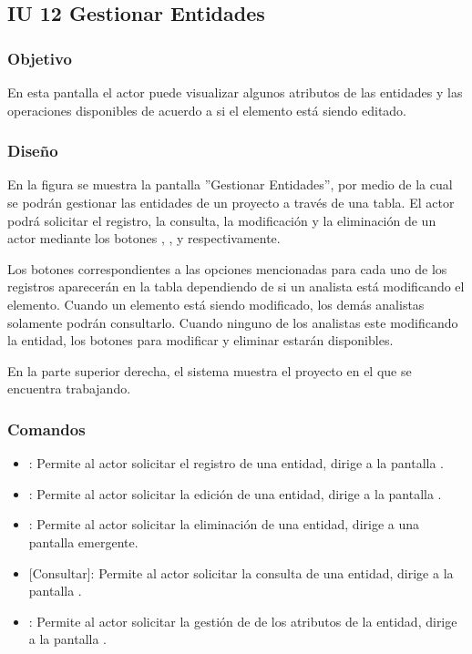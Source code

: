 \subsection{IU 12 Gestionar Entidades}

\subsubsection{Objetivo}
	En esta pantalla el actor puede visualizar algunos atributos de las entidades y las operaciones disponibles de acuerdo a si el elemento está siendo editado.
\subsubsection{Diseño}
	En la figura  se muestra la pantalla ''Gestionar Entidades'', por medio de la cual se podrán gestionar las entidades de un proyecto a través de una tabla. El actor podrá solicitar el registro, la consulta, la modificación y la eliminación de un actor mediante los botones , , \editar y \eliminar respectivamente.
	
	Los botones correspondientes a las opciones mencionadas para cada uno de los registros aparecerán en la tabla dependiendo de si un analista está modificando el elemento. Cuando un elemento está siendo modificado, los demás analistas solamente podrán consultarlo. Cuando ninguno de los analistas este modificando la entidad, los botones para modificar y eliminar estarán disponibles.
	
	En la parte superior derecha, el sistema muestra el proyecto en el que se encuentra trabajando.

\subsubsection{Comandos}
\begin{itemize}
	\item {}: Permite al actor solicitar el registro de una entidad, dirige a la pantalla .
	\item \editar [Modificar]: Permite al actor solicitar la edición de una entidad, dirige a la pantalla .
	\item \eliminar [Eliminar]: Permite al actor solicitar la eliminación de una entidad, dirige a una pantalla emergente.
	\item {} [Consultar]: Permite al actor solicitar la consulta de una entidad, dirige a la pantalla  .
	\item {}: Permite al actor solicitar la gestión de de los atributos de la entidad, dirige a la pantalla .
\end{itemize}
